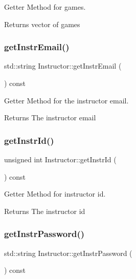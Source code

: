 Getter Method for games. 

\begin{DoxyReturn}{Returns}
vector of games 
\end{DoxyReturn}
\mbox{\label{classInstructor_a3f0a855ee446bd6db6b5a0e2133da3ac}} 
\subsubsection{\texorpdfstring{get\+Instr\+Email()}{getInstrEmail()}}
{\footnotesize\ttfamily std\+::string Instructor\+::get\+Instr\+Email (\begin{DoxyParamCaption}{ }\end{DoxyParamCaption}) const}



Getter Method for the instructor email. 

\begin{DoxyReturn}{Returns}
The instructor email 
\end{DoxyReturn}
\mbox{\label{classInstructor_a4dcf1f8643b542dd53208f02ca5a16a8}} 
\subsubsection{\texorpdfstring{get\+Instr\+Id()}{getInstrId()}}
{\footnotesize\ttfamily unsigned int Instructor\+::get\+Instr\+Id (\begin{DoxyParamCaption}{ }\end{DoxyParamCaption}) const}



Getter Method for instructor id. 

\begin{DoxyReturn}{Returns}
The instructor id 
\end{DoxyReturn}
\mbox{\label{classInstructor_a72e6160b964d0abdc3867a6eab817993}} 
\subsubsection{\texorpdfstring{get\+Instr\+Password()}{getInstrPassword()}}
{\footnotesize\ttfamily std\+::string Instructor\+::get\+Instr\+Password (\begin{DoxyParamCaption}{ }\end{DoxyParamCaption}) const}



